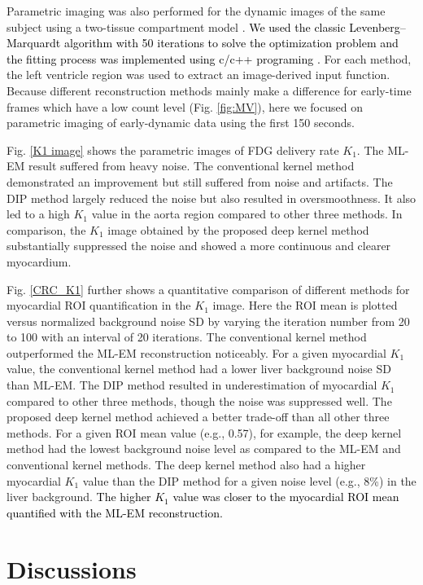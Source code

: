 \documentclass[]{IEEETran}
\newcommand{\txtb}[1]{\textcolor{black}{#1}}
\begin{document}
	Parametric imaging was also performed for the dynamic
	images of the same subject using a two-tissue compartment model \cite{Zuo2020}. \txtb{We used the classic Levenberg–Marquardt algorithm with 50 iterations to solve the optimization problem and the fitting process was implemented using c/c++ programing \cite{Wang2012}.} For each method, the left ventricle region was used to extract an image-derived input function. Because different reconstruction methods mainly make a difference for early-time frames which have a low count level (Fig. \ref{fig:MV}), here we focused on parametric imaging of early-dynamic data using the first 150 seconds.
	
	Fig. \ref{K1 image} shows the parametric images of FDG delivery rate $K_1$. The ML-EM result suffered from heavy noise. The conventional kernel method demonstrated an improvement but still suffered from noise and artifacts. The DIP method largely reduced the noise but also resulted in oversmoothness. It also led to a high  $K_1$ value in the aorta region compared to other three methods. In comparison, the $K_1$ image obtained by the proposed deep kernel method substantially suppressed the noise and showed a more continuous and clearer myocardium.
	
	Fig. \ref{CRC_K1} further shows a quantitative comparison of different methods for myocardial ROI quantification in the $K_1$ image. Here the ROI mean is plotted versus normalized background noise SD by varying the iteration number from 20 to 100 with an interval of 20 iterations. The conventional kernel method outperformed the ML-EM reconstruction noticeably. For a given myocardial $K_1$ value, the conventional kernel method had a lower liver background noise SD than ML-EM. The DIP method resulted in underestimation of myocardial $K_1$ compared to other three methods, though the noise was suppressed well. The proposed deep kernel method achieved a better trade-off than all other three methods. For a given ROI mean value (e.g., 0.57), for example, the deep kernel method had the lowest background noise level as compared to the ML-EM and conventional kernel methods. The deep kernel method also had a higher myocardial $K_1$ value than the DIP method for a given noise level (e.g., 8\%) in the liver background.  \txtb{The higher $K_1$ value was closer to the myocardial ROI mean quantified with the ML-EM reconstruction.}
	
	\section{Discussions}
	
\end{document}
